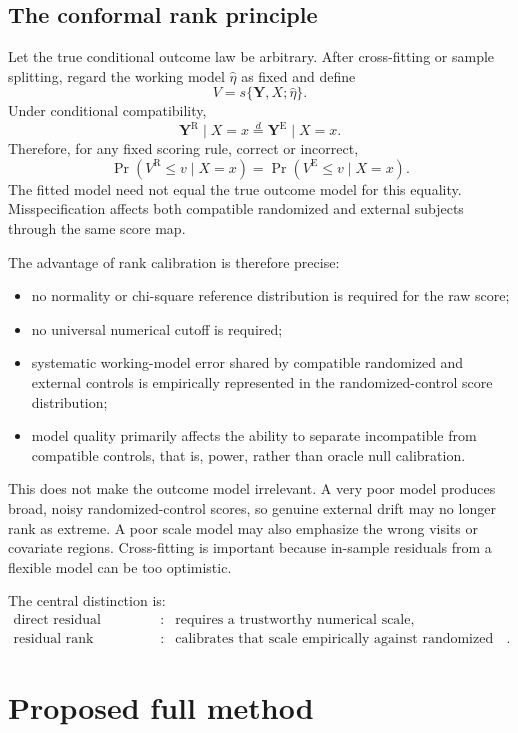 \documentclass[11pt]{article}
\newcommand{\R}{\mathrm{R}}
\newcommand{\E}{\mathrm{E}}
\begin{document}
\subsection{The conformal rank principle}

Let the true conditional outcome law be arbitrary. After cross-fitting or sample splitting, regard the working model $\widehat\eta$ as fixed and define
\[
V=s\{\bm Y,X;\widehat\eta\}.
\]
Under conditional compatibility,
\[
\bm Y^{\R}\mid X=x
\overset d=
\bm Y^{\E}\mid X=x.
\]
Therefore, for any fixed scoring rule, correct or incorrect,
\[
\Pr(V^{\R}\le v\mid X=x)
=
\Pr(V^{\E}\le v\mid X=x).
\tag{2}
\]
The fitted model need not equal the true outcome model for this equality. Misspecification affects both compatible randomized and external subjects through the same score map.

The advantage of rank calibration is therefore precise:
\begin{itemize}
    \item no normality or chi-square reference distribution is required for the raw score;
    \item no universal numerical cutoff is required;
    \item systematic working-model error shared by compatible randomized and external controls is empirically represented in the randomized-control score distribution;
    \item model quality primarily affects the ability to separate incompatible from compatible controls, that is, power, rather than oracle null calibration.
\end{itemize}

This does not make the outcome model irrelevant. A very poor model produces broad, noisy randomized-control scores, so genuine external drift may no longer rank as extreme. A poor scale model may also emphasize the wrong visits or covariate regions. Cross-fitting is important because in-sample residuals from a flexible model can be too optimistic.

The central distinction is:
\[
\begin{array}{ccl}
\text{direct residual threshold} &:& \text{requires a trustworthy numerical scale},\\
\text{residual rank} &:& \text{calibrates that scale empirically against randomized controls}.
\end{array}
\]

\section{Proposed full method}
\end{document}
